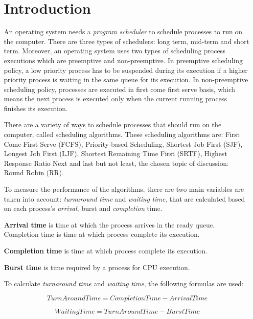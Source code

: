 \documentclass[12pt]{article}
\begin{document}

\tableofcontents
\pagebreak


\section{Introduction} 
An operating system needs a \textit{program scheduler} to schedule processes to
run on the computer. There are three types of schedulers: long term,
mid-term and short term. Moreover, an operating system uses two types
of scheduling process executions which are preemptive and non-preemptive. In
preemptive scheduling policy, a low priority process has to be suspended during
its execution if a higher priority process is waiting in the same queue for its
execution. In non-preemptive scheduling policy, processes are executed in
first come first serve basis, which means the next process is executed only when
the current running process finishes its execution.

There are a variety of ways to schedule processes that should run on the
computer, called scheduling algorithms. These scheduling algorithms are: First
Come First Serve (FCFS), Priority-based Scheduling, Shortest Job First (SJF),
Longest Job First (LJF), Shortest Remaining Time First (SRTF), Highest Response
Ratio Next and last but not least, the chosen topic of discussion: Round Robin
(RR).

To measure the performance of the algorithms, there are two main variables are
taken into account: \textit{turnaround time} and \textit{waiting time}, that are
calculated based on each process's \textit{arrival}, {burst} and
\textit{completion} time.

\textbf{Arrival time} is time at which the process arrives in the ready queue.
Completion time is time at which process complete its execution.

\textbf{Completion time} is time at which process complete its execution. 

\textbf{Burst time} is time required by a process for CPU execution.

To calculate \textit{turnaround time} and \textit{waiting time}, the following
formulas are used:

\[ Turn Around Time = Completion Time - Arrival Time \]

\[ Waiting Time = Turn Around Time - Burst Time \]
\end{document}
